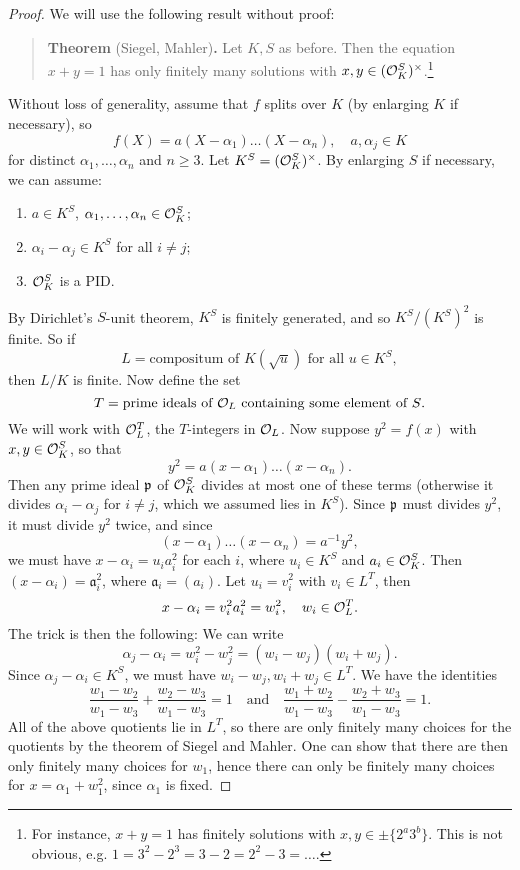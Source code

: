 \begin{proof}
  We will use the following result without proof:
  \begin{quote}
    \textbf{Theorem} (Siegel, Mahler)\textbf{.}
    Let $K, S$ as before. Then the equation $x + y = 1$
    has only finitely many solutions with $x, y \in (\mathcal{O}_K^S)^\times$.\footnote{For instance, $x + y = 1$ has finitely solutions with $x, y \in \pm \{2^a 3^b\}$. This is not obvious, e.g. $1 = 3^2 - 2^3 = 3 - 2 = 2^2 - 3 = \dots$.}
  \end{quote}
  Without loss of generality, assume that $f$ splits over
  $K$ (by enlarging $K$ if necessary), so
  \[
    f(X) = a(X - \alpha_1) \dots (X - \alpha_n), \quad a, \alpha_j \in K
  \]
  for distinct $\alpha_1, \dots, \alpha_n$ and
  $n \ge 3$. Let $K^S = (\mathcal{O}_K^S)^\times$.
  By enlarging $S$ if necessary, we
  can assume:
  \begin{enumerate}
    \item $a \in K^S$, $\alpha_1, \dots, \alpha_n \in \mathcal{O}_K^S$;
    \item $\alpha_i - \alpha_j \in K^S$ for all $i \ne j$;
    \item $\mathcal{O}_K^S$ is a PID.
  \end{enumerate}
  By Dirichlet's $S$-unit theorem, $K^S$ is
  finitely generated, and so $K^S / (K^S)^2$ is finite.
  So if
  \[
    L = \text{compositum of $K(\sqrt{u})$ for all $u \in K^S$},
  \]
  then $L / K$ is finite. Now define the set
  \[
    T = \text{prime ideals of $\mathcal{O}_L$ containing some element of $S$}.
  \]
  We will work with $\mathcal{O}_L^T$, the
  $T$-integers in $\mathcal{O}_L$. Now suppose
  $y^2 = f(x)$ with $x, y \in \mathcal{O}_K^S$, so that
  \[
    y^2 = a(x - \alpha_1) \dots (x - \alpha_n).
  \]
  Then any prime ideal $\mathfrak{p}$ of $\mathcal{O}_K^S$ divides
  at most one of these terms (otherwise it divides
  $\alpha_i - \alpha_j$ for $i \ne j$, which we assumed
  lies in $K^S$). Since $\mathfrak{p}$ must divides $y^2$, it
  must divide $y^2$ twice, and since
  \[
    (x - \alpha_1) \dots (x - \alpha_n) = a^{-1} y^2,
  \]
  we must have $x - \alpha_i = u_i a_i^2$
  for each $i$, where $u_i \in K^S$ and
  $a_i \in \mathcal{O}_K^S$. Then
  $(x - \alpha_i) = \mathfrak{a}_i^2$, where $\mathfrak{a}_i = (a_i)$.
  Let $u_i = v_i^2$ with $v_i \in L^T$, then
  \[
    x - \alpha_i = v_i^2 a_i^2 = w_i^2, \quad w_i \in \mathcal{O}_L^T.
  \]
  The trick is then the following: We can write
  \[
    \alpha_j - \alpha_i = w_i^2 - w_j^2
    = (w_i - w_j)(w_i + w_j).
  \]
  Since $\alpha_j - \alpha_i \in K^S$, we must have
  $w_i - w_j, w_i + w_j \in L^T$. We have the identities
  \[
    \frac{w_1 - w_2}{w_1 - w_3} + \frac{w_2 - w_3}{w_1 - w_3} = 1 \quad \text{and} \quad
    \frac{w_1 + w_2}{w_1 - w_3} - \frac{w_2 + w_3}{w_1 - w_3} = 1.
  \]
  All of the above quotients lie in $L^T$, so there
  are only finitely many choices for the quotients
  by the theorem of Siegel and Mahler.
  One can show that there are then only finitely
  many choices for $w_1$, hence there can only be
  finitely many choices for $x = \alpha_1 + w_1^2$,
  since $\alpha_1$ is fixed.
\end{proof}
